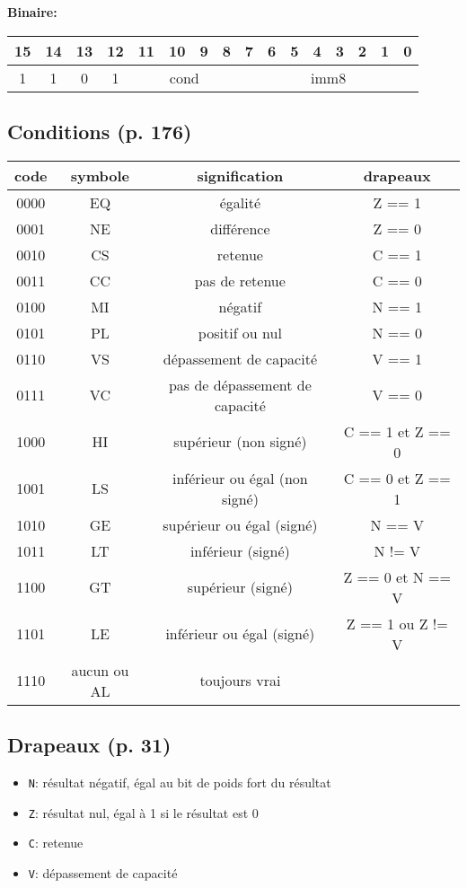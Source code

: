 \textbf{Binaire:}\\

\begin{tabular}{| c c c c c c c c c c c c c c c c |}
\hline
15 & 14 & 13 & 12 & \multicolumn{1}{|c}{11} & 10 & 9 & 8 & \multicolumn{1}{|c}{7} & 6 & 5 & 4 & 3 & 2 & 1 & 0 \\
\hline
1 & 1 & 0 & 1 & \multicolumn{4}{|c}{cond} & \multicolumn{8}{|c|}{imm8} \\
\hline
\end{tabular}








\subsection{Conditions (p. 176)}

\begin{tabular}{| c | c | c | c |}
\hline
\textbf{code} & \textbf{symbole} & \textbf{signification} & \textbf{drapeaux}\\
\hline
0000 & EQ & égalité & Z == 1\\
\hline
0001 & NE & différence & Z == 0\\
\hline
0010 & CS & retenue & C == 1\\
\hline
0011 & CC & pas de retenue & C == 0\\
\hline
0100 & MI & négatif & N == 1\\
\hline
0101 & PL & positif ou nul & N == 0\\
\hline
0110 & VS & dépassement de capacité & V == 1\\
\hline
0111 & VC & pas de dépassement de capacité & V == 0\\
\hline
1000 & HI & supérieur (non signé) & C == 1 et Z == 0\\
\hline
1001 & LS & inférieur ou égal (non signé) & C == 0 et Z == 1\\
\hline
1010 & GE & supérieur ou égal (signé) & N == V\\
\hline
1011 & LT & inférieur (signé) & N != V\\
\hline
1100 & GT & supérieur (signé) & Z == 0 et N == V\\
\hline
1101 & LE & inférieur ou égal (signé) & Z == 1 ou Z != V\\
\hline
1110 & aucun ou AL & toujours vrai & \\
\hline
\end{tabular}


\subsection{Drapeaux (p. 31)}

\begin{itemize}
	\item \texttt{N}: résultat négatif, égal au bit de poids fort du résultat
	\item \texttt{Z}: résultat nul, égal à 1 si le résultat est 0
	\item \texttt{C}: retenue
	\item \texttt{V}: dépassement de capacité
\end{itemize}



